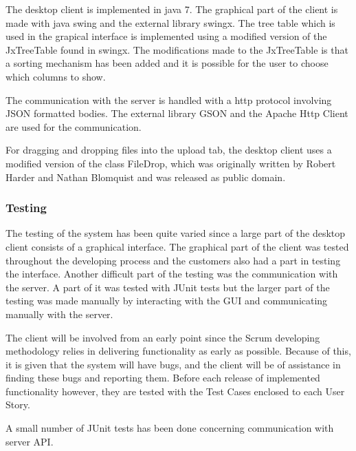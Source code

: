 The desktop client is implemented in java 7. The graphical part of the client is made with java swing and the external library swingx. The tree table which is used in the grapical interface is implemented using a modified version of the JxTreeTable found in swingx. The modifications made to the JxTreeTable is that a sorting mechanism has been added and it is possible for the user to choose which columns to show.

The communication with the server is handled with a http protocol involving JSON formatted bodies. The external library GSON and the Apache Http Client are used for the communication.

For dragging and dropping files into the upload tab, the desktop client uses a modified version of the class FileDrop, which was originally written by Robert Harder and Nathan Blomquist and was released as public domain.

\subsubsection{Testing}

The testing of the system has been quite varied since a large part of the desktop client consists of a graphical interface. The graphical part of the client was tested throughout the developing process and the customers also had a part in testing the interface. Another difficult part of the testing was the communication with the server. A part of it was tested with JUnit tests but the larger part of the testing was made manually by interacting with the GUI and communicating manually with the server.

The client will be involved from an early point since the Scrum developing methodology relies in delivering functionality as early as possible. Because of this, it is given that the system will have bugs, and the client will be of assistance in finding these bugs and reporting them. Before each release of implemented functionality however, they are tested with the Test Cases enclosed to each User Story.

A small number of JUnit tests has been done concerning communication with server API.

\FloatBarrier
